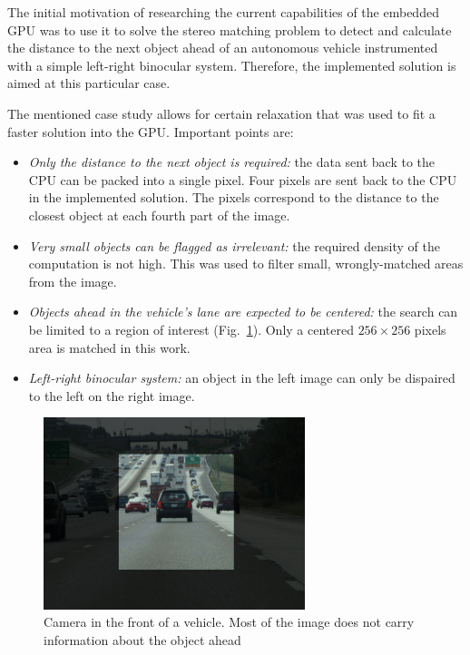 \documentclass[conference]{IEEEtran}
\begin{document}
The initial motivation of researching the current capabilities of the embedded GPU was to use it to solve the stereo matching problem to detect and calculate the distance to the next object ahead of an autonomous vehicle instrumented with a simple left-right binocular system. Therefore, the implemented solution is aimed at this particular case.

The mentioned case study allows for certain relaxation that was used to fit a faster solution into the GPU. Important points are:

\begin{itemize}
	\item \emph{Only the distance to the next object is required:} the data sent back to the CPU can be packed into a single pixel. Four pixels are sent back to the CPU in the implemented solution. The pixels correspond to the distance to the closest object at each fourth part of the image.
	\item \emph{Very small objects can be flagged as irrelevant:} the required density of the computation is not high. This was used to filter small, wrongly-matched areas from the image.
	\item \emph{Objects ahead in the vehicle's lane are expected to be centered:} the search can be limited to a region of interest (Fig.~\ref{fig:highway_camera}). Only a centered $256\times256$ pixels area is matched in this work.
	\item \emph{Left-right binocular system:} an object in the left image can only be dispaired to the left on the right image.
\end{itemize}

\begin{figure}[!t]
	\centering
	\includegraphics[width=3.0in]{highway_camera}
	\caption{Camera in the front of a vehicle. Most of the image does not carry information about the object ahead}
	\label{fig:highway_camera}
\end{figure}
\end{document}
